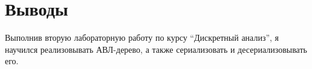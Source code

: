 \section{Выводы}

Выполнив вторую лабораторную работу по курсу \enquote{Дискретный анализ}, я научился реализовывать АВЛ-дерево, а также сериализовать и десериализовывать его.

\pagebreak

